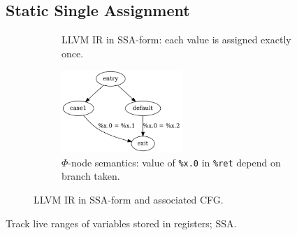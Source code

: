 
\subsection{Static Single Assignment}

\begin{figure}[htbp]
	\centering
	\begin{subfigure}[ht]{0.50\textwidth}
		
		\caption{LLVM IR in SSA-form: each value is assigned exactly once.}
		\label{fig:ssa_form}
	\end{subfigure}
	\begin{subfigure}[ht]{0.50\textwidth}
		\centering
		\includegraphics[width=0.50\textwidth]{inc/phi.png}
		\caption{$\Phi$-node semantics: value of \texttt{\%x.0} in \texttt{\%ret} depend on branch taken.}
		\label{fig:phi_node_semantics}
	\end{subfigure}
	\caption{LLVM IR in SSA-form and associated CFG.}
\end{figure}



Track live ranges of variables stored in registers; SSA.

